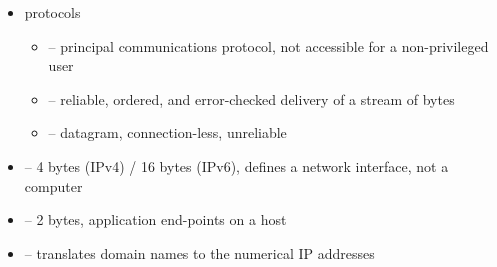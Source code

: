 
\begin{slide}
\begin{itemize}
\item protocols
    \begin{itemize}
    \item {} -- principal communications protocol,
    not accessible for a non-privileged user
    \item {} -- reliable, ordered, and
    error-checked delivery of a stream of bytes
    \item {} -- datagram, connection-less,
    unreliable
    \end{itemize}
\item {} -- 4 bytes (IPv4) / 16 bytes (IPv6), defines a network
interface, not a computer
\item {} -- 2 bytes, application end-points on a host
\item {} --  translates domain names to the
numerical IP addresses 
\end{itemize}
\end{slide}

